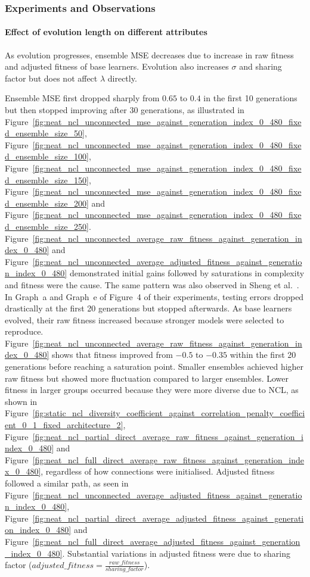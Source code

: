 \subsubsection{Experiments and Observations}
\label{subsubsec:evaluation_neat_ncl_observations}
\paragraph{Effect of evolution length on different attributes}
As evolution progresses, ensemble MSE decreases due to increase in raw fitness and adjusted fitness of base learners. Evolution also increases $\sigma$ and sharing factor but does not affect $\lambda$ directly. 

Ensemble MSE first dropped sharply from $0.65$ to $0.4$ in the first 10 generations but then stopped improving after 30 generations, as illustrated in Figure~\ref{fig:neat_ncl_unconnected_mse_against_generation_index_0_480_fixed_ensemble_size_50}, Figure~\ref{fig:neat_ncl_unconnected_mse_against_generation_index_0_480_fixed_ensemble_size_100}, Figure~\ref{fig:neat_ncl_unconnected_mse_against_generation_index_0_480_fixed_ensemble_size_150}, Figure~\ref{fig:neat_ncl_unconnected_mse_against_generation_index_0_480_fixed_ensemble_size_200} and Figure~\ref{fig:neat_ncl_unconnected_mse_against_generation_index_0_480_fixed_ensemble_size_250}. Figure~\ref{fig:neat_ncl_unconnected_average_raw_fitness_against_generation_index_0_480} and Figure~\ref{fig:neat_ncl_unconnected_average_adjusted_fitness_against_generation_index_0_480} demonstrated initial gains followed by saturations in complexity and fitness were the cause. The same pattern was also observed in Sheng et al.\ \cite{sheng2017niching}. In Graph~a and Graph~e of Figure~4 of their experiments, testing errors dropped drastically at the first 20 generations but stopped afterwards. As base learners evolved, their raw fitness increased because stronger models were selected to reproduce. Figure~\ref{fig:neat_ncl_unconnected_average_raw_fitness_against_generation_index_0_480} shows that fitness improved from $-0.5$ to $-0.35$ within the first 20 generations before reaching a saturation point. Smaller ensembles achieved higher raw fitness but showed more fluctuation compared to larger ensembles. Lower fitness in larger groups occurred because they were more diverse due to NCL, as shown in Figure~\ref{fig:static_ncl_diversity_coefficient_against_correlation_penalty_coefficient_0_1_fixed_architecture_2}, Figure~\ref{fig:neat_ncl_partial_direct_average_raw_fitness_against_generation_index_0_480} and Figure~\ref{fig:neat_ncl_full_direct_average_raw_fitness_against_generation_index_0_480}, regardless of how connections were initialised. Adjusted fitness followed a similar path, as seen in Figure~\ref{fig:neat_ncl_unconnected_average_adjusted_fitness_against_generation_index_0_480}, Figure~\ref{fig:neat_ncl_partial_direct_average_adjusted_fitness_against_generation_index_0_480} and Figure~\ref{fig:neat_ncl_full_direct_average_adjusted_fitness_against_generation_index_0_480}. Substantial variations in adjusted fitness were due to sharing factor ($adjusted\_fitness = \frac{raw\_fitness}{sharing\_factor}$). 

